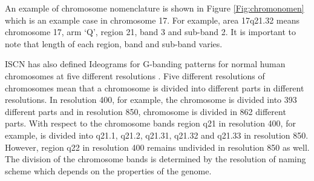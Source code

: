 An example of chromosome nomenclature is shown in Figure \ref{Fig:chromonomen} which is an example case in chromosome 17. For example, area 17q21.32 means chromosome 17, arm ‘Q', region 21, band 3 and sub-band 2. It is important to note that length of each region, band and sub-band varies.

ISCN has also defined Ideograms for G-banding patterns for normal human chromosomes at five different resolutions \cite{iscn}. Five different resolutions of chromosomes mean that a chromosome is divided into different parts in different resolutions. In resolution 400, for example, the chromosome is divided into 393 different parts and in resolution 850, chromosome is divided in 862 different parts. With respect to the chromosome bands region q21 in resolution 400, for example, is divided into q21.1, q21.2, q21.31, q21.32 and q21.33 in resolution 850. However, region q22 in resolution 400 remains undivided in resolution 850 as well. The division of the chromosome bands is determined by the resolution of naming scheme which depends on the properties of the genome.